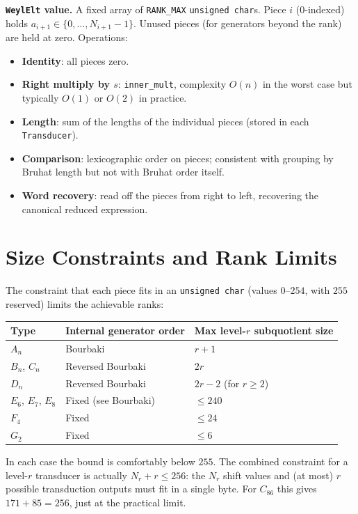 \documentclass[12pt]{amsart}
\begin{document}
\textbf{\texttt{WeylElt} value.}  A fixed array of \texttt{RANK\_MAX}
\texttt{unsigned char}s.  Piece $i$ (0-indexed) holds $a_{i+1} \in \{0,
\ldots, N_{i+1}-1\}$.  Unused pieces (for generators beyond the rank) are
held at zero.  Operations:
\begin{itemize}
  \item \textbf{Identity}: all pieces zero.
  \item \textbf{Right multiply by $s$}: \texttt{inner\_mult}, complexity
    $O(n)$ in the worst case but typically $O(1)$ or $O(2)$ in practice.
  \item \textbf{Length}: sum of the lengths of the individual pieces (stored
    in each \texttt{Transducer}).
  \item \textbf{Comparison}: lexicographic order on pieces; consistent with
    grouping by Bruhat length but not with Bruhat order itself.
  \item \textbf{Word recovery}: read off the pieces from right to left,
    recovering the canonical reduced expression.
\end{itemize}

\section{Size Constraints and Rank Limits}

The constraint that each piece fits in an \texttt{unsigned char} (values
$0$--$254$, with $255$ reserved) limits the achievable ranks:

\begin{center}
\begin{tabular}{l|l|l}
Type & Internal generator order & Max level-$r$ subquotient size \\ \hline
$A_n$ & Bourbaki & $r+1$ \\
$B_n$, $C_n$ & Reversed Bourbaki & $2r$ \\
$D_n$ & Reversed Bourbaki & $2r-2$ (for $r \geq 2$) \\
$E_6$, $E_7$, $E_8$ & Fixed (see Bourbaki) & $\leq 240$ \\
$F_4$ & Fixed & $\leq 24$ \\
$G_2$ & Fixed & $\leq 6$
\end{tabular}
\end{center}

In each case the bound is comfortably below $255$.  The combined constraint
for a level-$r$ transducer is actually $N_r + r \leq 256$: the $N_r$
shift values and (at most) $r$ possible transduction outputs must fit in
a single byte.  For $C_{86}$ this gives $171 + 85 = 256$, just at the
practical limit.
\end{document}
